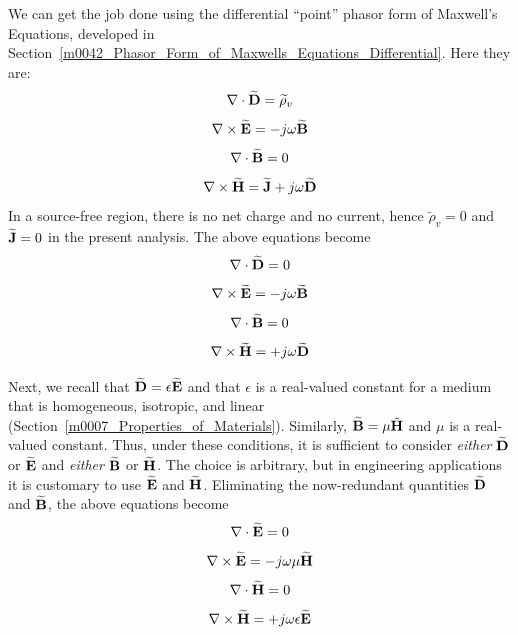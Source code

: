 We can get the job done using the differential ``point'' phasor form of Maxwell's Equations, 
developed in Section~\ref{m0042_Phasor_Form_of_Maxwells_Equations_Differential}.  Here they are:
%
\begin{equation}
\nabla \cdot \widetilde{\bf D} = \widetilde{\rho}_v
\end{equation}
%
\begin{equation}   
\nabla \times  \widetilde{\bf E} = -j\omega\widetilde{\bf B}
\end{equation}
%
\begin{equation}   
\nabla \cdot \widetilde{\bf B} = 0
\end{equation}
%
\begin{equation} 
\nabla \times \widetilde{\bf H} = \widetilde{\bf J} + j\omega\widetilde{\bf D}
\end{equation}
%
In a source-free region, there is no net charge and no current, hence $\widetilde{\rho}_v=0$ and $\widetilde{\bf J}=0$ in the present analysis.  
The above equations become
%
\begin{equation}
\nabla \cdot \widetilde{\bf D} = 0
\end{equation}
%
\begin{equation}   
\nabla \times  \widetilde{\bf E} = -j\omega\widetilde{\bf B}
\end{equation}
%
%
\begin{equation}   
\nabla \cdot \widetilde{\bf B} = 0
\end{equation}
%
\begin{equation} 
\nabla \times \widetilde{\bf H} = +j\omega\widetilde{\bf D}
\end{equation}

Next, we recall that $\widetilde{\bf D}=\epsilon\widetilde{\bf E}$ and that $\epsilon$ is a real-valued constant for a medium that is homogeneous, 
isotropic, 
and linear 
(Section~\ref{m0007_Properties_of_Materials}).
Similarly, $\widetilde{\bf B}=\mu\tilde{\bf H}$ and $\mu$ is a real-valued constant.
Thus, under these conditions, it is sufficient to consider \emph{either} $\widetilde{\bf D}$ or $\widetilde{\bf E}$ and \emph{either} $\widetilde{\bf B}$ or $\widetilde{\bf H}$.  The choice is arbitrary, but in engineering applications it is customary to use $\widetilde{\bf E}$ and $\widetilde{\bf H}$.
Eliminating the now-redundant quantities $\widetilde{\bf D}$ and $\widetilde{\bf B}$, the above equations become   
%
\begin{equation}
\nabla \cdot \widetilde{\bf E} = 0
\label{m0036_eGL3}
\end{equation}
%
\begin{equation}   
\nabla \times  \widetilde{\bf E} = -j\omega\mu\widetilde{\bf H}
\label{m0036_eMFE3}
\end{equation}
%
\begin{equation}
\nabla \cdot \widetilde{\bf H} = 0
\end{equation}
%
\begin{equation} 
\nabla \times \widetilde{\bf H} = +j\omega\epsilon\widetilde{\bf E}
\label{m0036_eAL3}
\end{equation}

